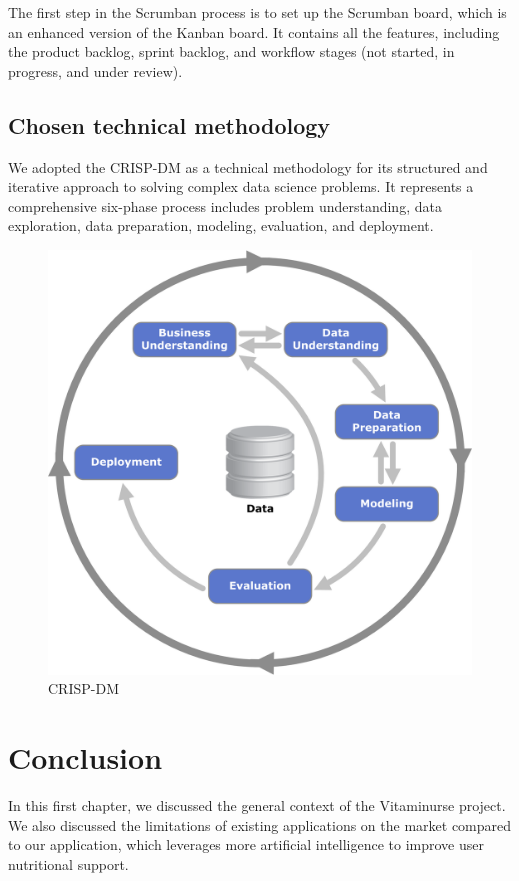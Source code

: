 The first step in the Scrumban process is to set up the Scrumban board, which is an enhanced version of the Kanban board. It contains all the features, including the product backlog, sprint backlog, and workflow stages (not started, in progress, and under review).




\newpage
\subsection{Chosen technical methodology}

We adopted the CRISP-DM as a technical methodology for its structured and iterative approach to solving complex data science problems. It represents a comprehensive six-phase process includes problem understanding, data exploration, data preparation, modeling, evaluation, and deployment.
\begin{center}
\begin{figure}[H]
            \centering
            \includegraphics[scale=0.44]{images/CRISP.png}
            \caption{CRISP-DM} 
            \label{fig:CRIS-DM}
        \end{figure}
\end{center}




\section*{Conclusion}
In this first chapter, we discussed the general context of the Vitaminurse project. We also discussed the limitations of existing applications on the market compared to our application, which leverages more artificial intelligence to improve user nutritional support.

